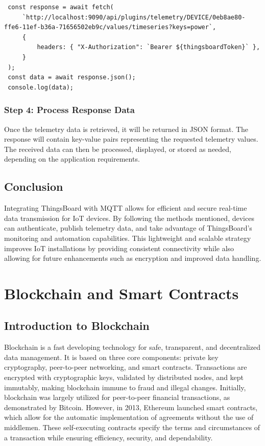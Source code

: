 \documentclass[a4paper,12pt]{report}
\begin{document}
 \begin{lstlisting}
 const response = await fetch( 
     `http://localhost:9090/api/plugins/telemetry/DEVICE/0eb8ae80-ffe6-11ef-b36a-71656502eb9c/values/timeseries?keys=power`,
     {
         headers: { "X-Authorization": `Bearer ${thingsboardToken}` },
     }
 );
 const data = await response.json();
 console.log(data);
 \end{lstlisting}
 
 \subsection{Step 4: Process Response Data}
 Once the telemetry data is retrieved, it will be returned in JSON format. The response will contain key-value pairs representing the requested telemetry values. The received data can then be processed, displayed, or stored as needed, depending on the application requirements.
 \section{Conclusion}
 Integrating ThingsBoard with MQTT allows for efficient and secure real-time data transmission for IoT devices. By following the methods mentioned, devices can authenticate, publish telemetry data, and take advantage of ThingsBoard's monitoring and automation capabilities. This lightweight and scalable strategy improves IoT installations by providing consistent connectivity while also allowing for future enhancements such as encryption and improved data handling.

\chapter{Blockchain and Smart Contracts}
\section{Introduction to Blockchain}
Blockchain is a fast developing technology for safe, transparent, and decentralized data management. It is based on three core components: private key cryptography, peer-to-peer networking, and smart contracts\cite{swan2016blockchain}. Transactions are encrypted with cryptographic keys, validated by distributed nodes, and kept immutably, making blockchain immune to fraud and illegal changes\cite{tern2021survey}.
Initially, blockchain was largely utilized for peer-to-peer financial transactions, as demonstrated by Bitcoin.  However, in 2013, Ethereum launched smart contracts, which allow for the automatic implementation of agreements without the use of middlemen\cite{yuan2018shadoweth}.  These self-executing contracts specify the terms and circumstances of a transaction while ensuring efficiency, security, and dependability\cite{falazi2020smart}.
\end{document}
